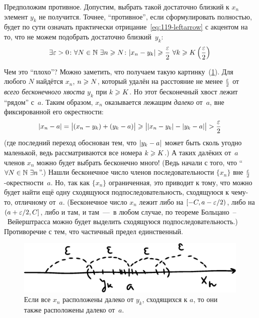 \documentclass[a4paper,12pt]{article}
\begin{document}
\begin{solution}
    Предположим противное.
    Допустим, выбрать такой достаточно близкий к $x_n$ элемент $y_k$ не получится.
    Точнее, ``противное'', если сформулировать полностью, будет по сути означать практически отрицание~\eqref{eq:119-leftarrow} с акцентом на то, что не можем подобрать достаточно близкий~$y_k$:
    \[
      \exists \eps > 0\colon \forall N \in \NN\ \exists n \geq N\colon |x_n - y_k| \geq \frac{\eps}{2}\ \forall k \hm\geq K\left(\frac{\eps}{2}\right)
    \]
    
    Чем это ``плохо''?
    Можно заметить, что получаем такую картинку~(\ref{fig:far-from-all-yk}).
    Для любого $N$ найдётся $x_n$, $n \hm\geq N$, который удалён на расстояние не менее $\frac{\varepsilon}{2}$ от \emph{всего бесконечного хвоста} $y_k$ при $k \hm\geq K$.
    Но этот бесконечный хвост лежит ``рядом'' с~$a$.
    Таким образом, $x_n$ оказывается лежащим \emph{далеко} от~$a$, вне фиксированной его окрестности:
    \[
      |x_n - a| = \bigl|(x_n - y_k) + (y_k - a)\bigr|
        \geqslant \bigl||x_n - y_k| - |y_k - a|\bigr| > \frac{\varepsilon}{2}
    \]
    (где последний переход обоснован тем, что $|y_k \hm- a|$ может быть сколь угодно маленькой, ведь рассматриваются все номера $k \hm\geq K$.)
    А таких далёких от~$a$ членов $x_n$ можно будет выбрать бесконечно много!
    (Ведь начали с того, что ``$\forall N \hm\in \NN\ \exists n$''.)
    Нашли бесконечное число членов последовательности $\{x_n\}$ вне $\frac{\varepsilon}{2}$-окрестности~$a$.
    Но, так как $\{x_n\}$ ограниченная, это приводит к тому, что можно будет найти ещё одну сходящуюся подпоследовательность, сходящуюся к чему-то, отличному от~$a$.
    (Бесконечное число $x_n$ лежит либо на $[-C, a \hm- \eps \hm/ 2)$, либо на $(a \hm+ \eps \hm/ 2, C]$, либо и там, и там~---~в любом случае, по теореме Больцано~--~Вейерштрасса можно будет выделить сходящуюся подпоследовательность.)
    Противоречие с тем, что частичный предел единственный.
    
    \begin{figure}[ht]
      \centering
      \includegraphics[width=0.6\linewidth]{images/far-from-all-yk}
      
      \caption{
        Если все $x_n$ расположены далеко от $y_k$, сходящихся к $a$, то они также расположены далеко от~$a$.
      }
      \label{fig:far-from-all-yk}
    \end{figure}
        

\end{solution}
\end{document}
